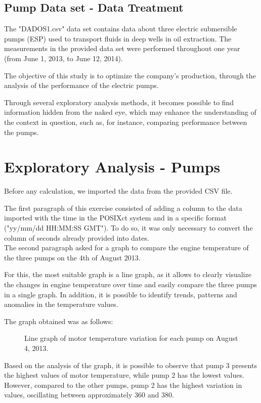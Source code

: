 \documentclass[conference]{IEEEtran}
\begin{document}
\subsection{Pump Data set - Data Treatment}
The "DADOS1.csv" data set contains data about three electric submersible pumps (ESP) used to transport fluids in deep wells in oil extraction. The measurements in the provided data set were performed throughout one year (from June 1, 2013, to June 12, 2014).

The objective of this study is to optimize the company's production, through the analysis of the performance of the electric pumps.

Through several exploratory analysis methods, it becomes possible to find information hidden from the naked eye, which may enhance the understanding of the context in question, such as, for instance, comparing performance between the pumps.

\section{Exploratory Analysis - Pumps}
Before any calculation, we imported the data from the provided CSV file.

The first paragraph of this exercise consisted of adding a column to the data imported with the time in the POSIXct system and in a specific format ("yy/mm/dd HH:MM:SS GMT"). To do so, it was only necessary to convert the column of seconds already provided into dates.\\

The second paragraph asked for a graph to compare the engine temperature of the three pumps on the 4th of August 2013.

For this, the most suitable graph is a line graph, as it allows to clearly visualize the changes in engine temperature over time and easily compare the three pumps in a single graph. In addition, it is possible to identify trends, patterns and anomalies in the temperature values.

The graph obtained was as follows:

\begin{figure}[htbp]
    \caption{Line graph of motor temperature variation for each pump on August 4, 2013.}
    \label{pump_lineGraph_motorTemperature}
\end{figure}

Based on the analysis of the graph, it is possible to observe that pump 3 presents the highest values of motor temperature, while pump 2 has the lowest values. However, compared to the other pumps, pump 2 has the highest variation in values, oscillating between approximately 360 and 380.
\end{document}
